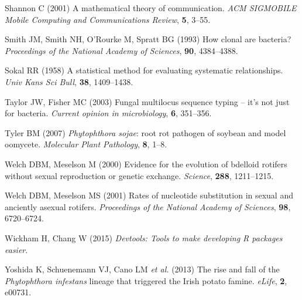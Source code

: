 \documentclass[double,12pt]{beavtex}
\begin{document}
  \hypertarget{ref-shannon2001mathematical}{}
  Shannon C (2001) A mathematical theory of communication. \emph{ACM
  SIGMOBILE Mobile Computing and Communications Review}, \textbf{5},
  3--55.
  
  \hypertarget{ref-smith1993how}{}
  Smith JM, Smith NH, O'Rourke M, Spratt BG (1993) How clonal are
  bacteria? \emph{Proceedings of the National Academy of Sciences},
  \textbf{90}, 4384--4388.
  
  \hypertarget{ref-sokal1958statistical}{}
  Sokal RR (1958) A statistical method for evaluating systematic
  relationships. \emph{Univ Kans Sci Bull}, \textbf{38}, 1409--1438.
  
  \hypertarget{ref-taylor2003fungal}{}
  Taylor JW, Fisher MC (2003) Fungal multilocus sequence typing -- it's
  not just for bacteria. \emph{Current opinion in microbiology},
  \textbf{6}, 351--356.
  
  \hypertarget{ref-tyler2007phytophthora}{}
  Tyler BM (2007) \emph{Phytophthora sojae}: root rot pathogen of soybean
  and model oomycete. \emph{Molecular Plant Pathology}, \textbf{8}, 1--8.
  
  \hypertarget{ref-welch2000evidence}{}
  Welch DBM, Meselson M (2000) Evidence for the evolution of bdelloid
  rotifers without sexual reproduction or genetic exchange.
  \emph{Science}, \textbf{288}, 1211--1215.
  
  \hypertarget{ref-welch2001rates}{}
  Welch DBM, Meselson MS (2001) Rates of nucleotide substitution in sexual
  and anciently asexual rotifers. \emph{Proceedings of the National
  Academy of Sciences}, \textbf{98}, 6720--6724.
  
  \hypertarget{ref-wickham2015devtools}{}
  Wickham H, Chang W (2015) \emph{Devtools: Tools to make developing R
  packages easier}.
  
  \hypertarget{ref-yoshida2013rise}{}
  Yoshida K, Schuenemann VJ, Cano LM \emph{et al.} (2013) The rise and
  fall of the \emph{Phytophthora infestans} lineage that triggered the
  Irish potato famine. \emph{eLife}, \textbf{2}, e00731.
\end{document}
